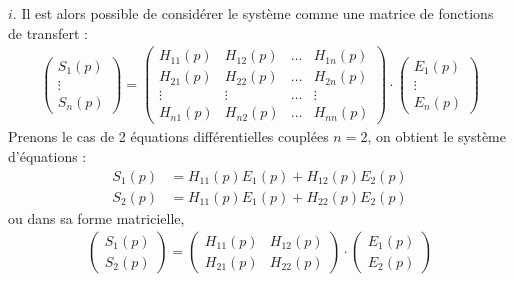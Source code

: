 $i$. Il est alors possible de considérer le système comme une matrice 
de fonctions de transfert :
\begin{align*}
    \begin{pmatrix} 
        S_1(p)\\
        \vdots\\
        S_n(p)
    \end{pmatrix}=
    \begin{pmatrix} 
        H_{11}(p) & H_{12}(p) &\ldots & H_{1n}(p) \\
        H_{21}(p) & H_{22}(p) &\ldots & H_{2n}(p) \\
        \vdots    & \vdots    &\ldots & \vdots    \\ 
        H_{n1}(p) & H_{n2}(p) &\ldots & H_{nn}(p) 
    \end{pmatrix}\cdot
    \begin{pmatrix} 
        E_1(p)\\
        \vdots\\
        E_n(p)
    \end{pmatrix}
\end{align*}
Prenons le cas de 2 équations différentielles couplées $n=2$, on obtient 
le système d'équations  :
\begin{align*}
    S_1(p) &= H_{11}(p) E_1(p) + H_{12}(p) E_2(p) \\
    S_2(p) &= H_{11}(p) E_1(p) + H_{22}(p) E_2(p)
\end{align*}
ou dans sa forme matricielle, 
\begin{align*}
    \begin{pmatrix} 
        S_1(p)\\
        S_2(p)
    \end{pmatrix}=
    \begin{pmatrix} 
        H_{11}(p) & H_{12}(p) \\
        H_{21}(p) & H_{22}(p) 
    \end{pmatrix}\cdot
    \begin{pmatrix} 
        E_1(p)\\
        E_2(p)
    \end{pmatrix}
\end{align*}
